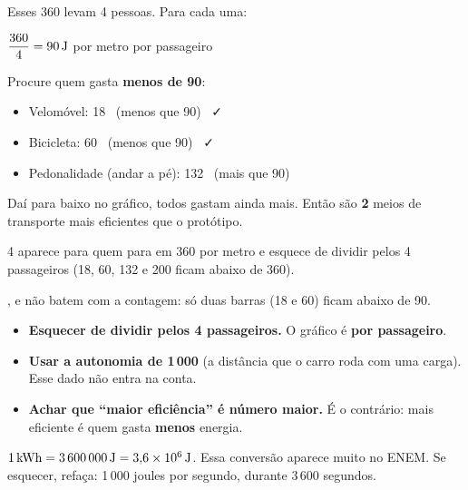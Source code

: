 Esses 360 levam 4 pessoas. Para cada uma:
\begin{conta}
$\dfrac{360}{4} = 90\,\text{J}$ por metro por passageiro
\end{conta}

Procure quem gasta \textbf{menos de 90}:
\begin{itemize}
  \item Velomóvel: 18 \ (menos que 90) \ \faCheck
  \item Bicicleta: 60 \ (menos que 90) \ \faCheck
  \item Pedonalidade (andar a pé): 132 \ (mais que 90) \ \faTimes
\end{itemize}
Daí para baixo no gráfico, todos gastam ainda mais. Então são \textbf{2} meios de transporte mais eficientes que o protótipo.


\begin{outras}
 4 aparece para quem para em 360 por metro e esquece de dividir pelos 4 passageiros (18, 60, 132 e 200 ficam abaixo de 360).\par
{},  e  não batem com a contagem: só duas barras (18 e 60) ficam abaixo de 90.
\end{outras}

\begin{pegadinha}
\begin{itemize}
  \item \textbf{Esquecer de dividir pelos 4 passageiros.} O gráfico é \textbf{por passageiro}.
  \item \textbf{Usar a autonomia de 1\,000} (a distância que o carro roda com uma carga). Esse dado não entra na conta.
  \item \textbf{Achar que ``maior eficiência'' é número maior.} É o contrário: mais eficiente é quem gasta \textbf{menos} energia.
\end{itemize}
\end{pegadinha}

\begin{guardar}
$1\,\text{kWh} = 3\,600\,000\,\text{J} = 3{,}6 \times 10^{6}\,\text{J}$. Essa conversão aparece muito no ENEM. Se esquecer, refaça:
1\,000 joules por segundo, durante 3\,600 segundos.
\end{guardar}
